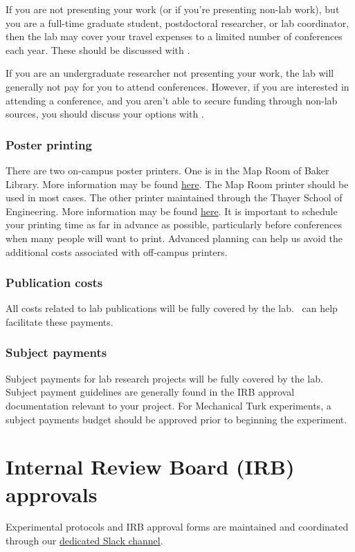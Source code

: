 \documentclass{tufte-book} %
\begin{document}
 If you are not presenting your work (or if you're presenting non-lab
 work), but you are a full-time graduate student, postdoctoral
 researcher, or lab coordinator, then the lab may cover your travel
 expenses to a limited number of conferences each year.  These should
 be discussed with \director.

If you are an undergraduate researcher not presenting your work, the lab
will generally not pay for you to attend conferences.  However, if you
are interested in attending a conference, and you aren't able to
secure funding through non-lab sources, you should discuss your
options with \director.

 \subsection{Poster printing}
 There are two on-campus poster printers.  One is in the Map Room of
 Baker Library.  More information may be found
 \href{http://www.dartmouth.edu/~library/maproom/printingfaq.html}{here}.
 The Map Room printer should be used in most cases.  The other printer
 maintained through the Thayer School of Engineering.  More
 information may be found
 \href{http://kb.thayer.dartmouth.edu/article/286-printing}{here}.  It
 is important to schedule your printing time as far in advance as
 possible, particularly before conferences when many people will want
 to print.  Advanced planning can help us avoid the additional costs
 associated with off-campus printers.


 \subsection{Publication costs}
All costs related to lab publications will be fully covered by the
lab.  \coordinator~can help facilitate these payments.

 \subsection{Subject payments}
 Subject payments for lab research projects will be fully covered by
 the lab.  Subject payment guidelines are generally found in the IRB
 approval documentation relevant to your project.  For Mechanical Turk
 experiments, a subject payments budget should be approved prior to
 beginning the experiment.


\chapter{Internal Review Board (IRB) approvals}
Experimental  protocols and IRB approval forms are maintained and
coordinated through our
\href{https://context-lab.slack.com/archives/admin}{dedicated Slack
  channel}.
\end{document}
